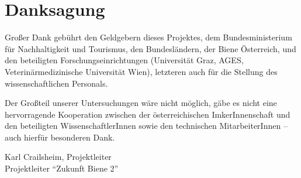 {}
\section*{Danksagung}

Großer Dank gebührt den Geldgebern dieses Projektes, dem Bundesministerium für Nachhaltigkeit und Tourismus, den Bundesländern, der Biene Österreich, und den beteiligten Forschungseinrichtungen (Universität Graz, AGES, Veterinärmedizinische Universität Wien), letzteren auch für die Stellung des wissenschaftlichen Personals.

Der Großteil unserer Untersuchungen wäre nicht möglich, gäbe es nicht eine hervorragende Kooperation zwischen der österreichischen ImkerInnenschaft und den beteiligten WissenschaftlerInnen sowie den technischen MitarbeiterInnen – auch hierfür besonderen Dank.

\begin{flushright}
    Karl Crailsheim, Projektleiter \\
    Projektleiter \enquote{Zukunft Biene 2}
\end{flushright}